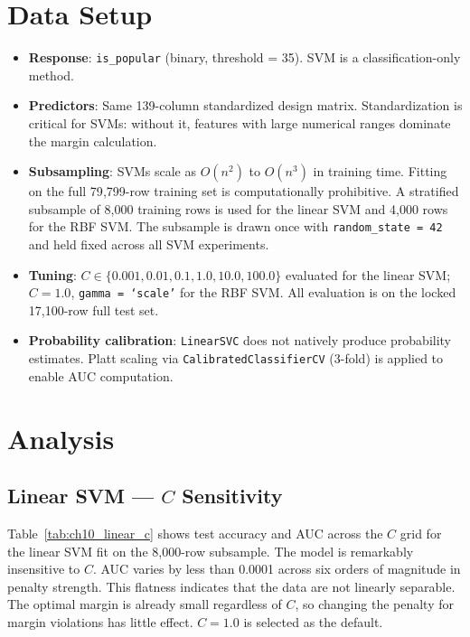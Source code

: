 \documentclass[12pt, oneside]{book}
\begin{document}
\section{Data Setup}
 
\begin{itemize}
    \item \textbf{Response}: \texttt{is\_popular} (binary, threshold = 35). SVM is a classification-only method.
    \item \textbf{Predictors}: Same 139-column standardized design matrix. Standardization is critical for SVMs: without it, features with large numerical ranges dominate the margin calculation.
    \item \textbf{Subsampling}: SVMs scale as $O(n^2)$ to $O(n^3)$ in training time. Fitting on the full 79{,}799-row training set is computationally prohibitive. A stratified subsample of 8{,}000 training rows is used for the linear SVM and 4{,}000 rows for the RBF SVM. The subsample is drawn once with \texttt{random\_state = 42} and held fixed across all SVM experiments.
    \item \textbf{Tuning}: $C \in \{0.001, 0.01, 0.1, 1.0, 10.0, 100.0\}$ evaluated for the linear SVM; $C = 1.0$, \texttt{gamma = `scale'} for the RBF SVM. All evaluation is on the locked 17{,}100-row full test set.
    \item \textbf{Probability calibration}: \texttt{LinearSVC} does not natively produce probability estimates. Platt scaling via \texttt{CalibratedClassifierCV} (3-fold) is applied to enable AUC computation.
\end{itemize}
 
\section{Analysis}
 
\subsection{Linear SVM --- $C$ Sensitivity}
 
Table~\ref{tab:ch10_linear_c} shows test accuracy and AUC across the $C$ grid for the linear SVM fit on the 8{,}000-row subsample. The model is remarkably insensitive to $C$. AUC varies by less than 0.0001 across six orders of magnitude in penalty strength. This flatness indicates that the data are not linearly separable. The optimal margin is already small regardless of $C$, so changing the penalty for margin violations has little effect. $C = 1.0$ is selected as the default.
 
\end{document}
